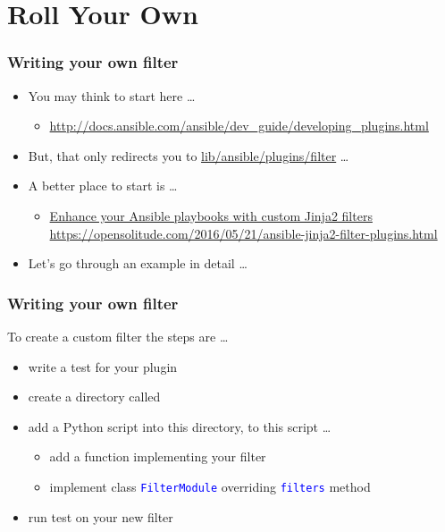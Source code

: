 \documentclass[pdf]{beamer}
\begin{document}
\section{Roll Your Own}

\begin{frame}
  \frametitle{Writing your own filter}
  \begin{itemize}[<+->]
    \item[] You may think to start here \ldots
      \begin{itemize}
        \item<1->
          \small \url{http://docs.ansible.com/ansible/dev_guide/developing_plugins.html}
      \end{itemize}
    \item[]
      But, that only redirects you to
      \href{https://github.com/ansible/ansible/blob/devel/lib/ansible/plugins/filter/core.py}{lib/ansible/plugins/filter} \ldots
    \item[] A better place to start is \ldots
      \begin{itemize}
        \item
          \href{https://opensolitude.com/2016/05/21/ansible-jinja2-filter-plugins.html}{Enhance
          your Ansible playbooks with custom Jinja2 filters} \newline
        \small \url{https://opensolitude.com/2016/05/21/ansible-jinja2-filter-plugins.html}
      \end{itemize}
    \item[] Let's go through an example in detail \ldots
  \end{itemize}
\end{frame}

\begin{frame}[t,fragile]
  \frametitle{Writing your own filter}
  To create a custom filter the steps are \ldots
  \begin{itemize}[<+->]
    \item {write a test for your plugin}
    \item {create a directory called }
    \item {add a Python script into this directory, to this script \ldots}
      \begin{itemize}
        \item {add a function implementing your filter}
        \item {implement class \textcolor{blue}{\texttt{FilterModule}} overriding \textcolor{blue}{\texttt{filters}} method}
      \end{itemize}
    \item {run test on your new filter}
  \end{itemize}
\end{frame}
\end{document}
